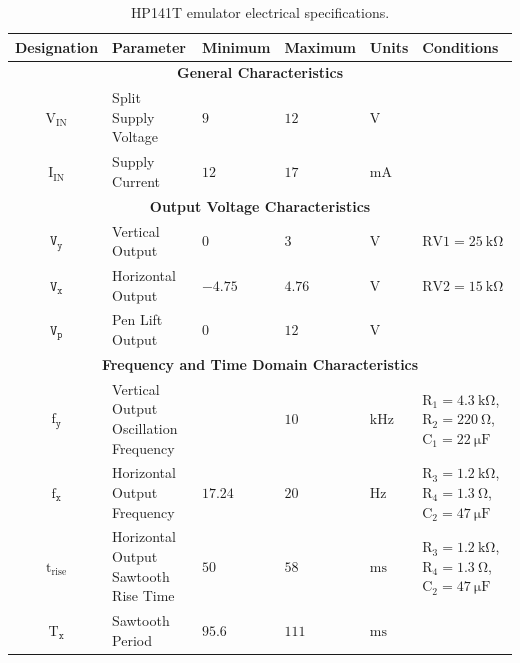 \documentclass[class=report,11pt,crop=false]{standalone}
\begin{document}
	\begin{table}[ht!]
		\caption{HP141T emulator electrical specifications.}
		\label{tab:vertical-output-emulator-ct-specifications}
		\centering
		\begin{tabular}{|cm{10em}m{5em}m{5em}m{5em}m{8em}|}
			\hline
			\textbf{Designation} & \textbf{Parameter} &	\textbf{Minimum} &  \textbf{Maximum}	& \textbf{Units} & \textbf{Conditions}\\
			\hline
			\multicolumn{6}{c}{\textbf{General Characteristics}}\\
			\hline
			$\text{V}_{\text{IN}}$ & Split Supply Voltage  & $9$ & $12$ & $\si{\volt}$ & \\
			\hline
			$\text{I}_{\text{IN}}$ & Supply Current  & $12$ & $17$ & $\si{\milli\ampere}$ & \\
			\hline
			\multicolumn{6}{c}{\textbf{Output Voltage Characteristics}}\\
			\hline
			$\texttt{V}_\texttt{y}$	& Vertical Output	&	$0$	&	$3$ & $\si{\volt}$ & $\text{RV1} = \SI{25}{\kilo\ohm}$ \\
			\hline
			$\texttt{V}_\texttt{x}$	& Horizontal Output	&	$-4.75$	&	$4.76$ & $\si{\volt}$ & $\text{RV2} = \SI{15}{\kilo\ohm}$\\
			\hline
			$\texttt{V}_\texttt{p}$	& Pen Lift Output	&   $0$	& 	$12$ & $\si{\volt}$ & \\
			\hline
			\multicolumn{6}{c}{\textbf{Frequency and Time Domain Characteristics}}\\
			\hline
			$\text{f}_\texttt{y}$	& Vertical Output Oscillation Frequency	&	&	$10$ & $\si{\kilo\hertz}$ & $\text{R}_1 = \SI{4.3}{\kilo\ohm}$, $\text{R}_2 = \SI{220}{\ohm}$, $\text{C}_1 = \SI{22}{\micro\farad}$ \\
			\hline
			$\text{f}_\texttt{x}$	& Horizontal Output Frequency	& $17.24$ 	& $20$ & $\si{\hertz}$ & $\text{R}_3 = \SI{1.2}{\kilo\ohm}$, $\text{R}_4 = \SI{1.3}{\ohm}$, $\text{C}_2 = \SI{47}{\micro\farad}$\\
			\hline
			$\text{t}_\text{rise}$				& Horizontal Output Sawtooth Rise Time	& $50$	&	$58$ &	$\si{\milli\second}$	&	$\text{R}_3 = \SI{1.2}{\kilo\ohm}$, $\text{R}_4 = \SI{1.3}{\ohm}$, $\text{C}_2 = \SI{47}{\micro\farad}$\\
			\hline
			$\text{T}_\texttt{x}$	&	Sawtooth Period	& $95.6$	& $111$	& $\si{\milli\second}$	& \\
			\hline
		\end{tabular}
	\end{table}
\end{document}
